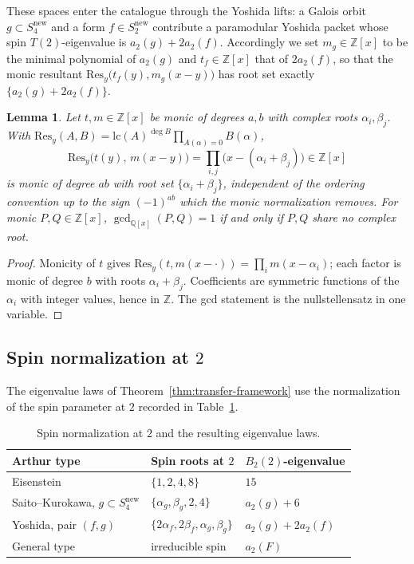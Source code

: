 \documentclass[10pt,a4paper]{amsart}
\newtheorem{lemma}[theorem]{Lemma}
\newcommand{\Q}{\mathbb{Q}}
\newcommand{\Z}{\mathbb{Z}}
\newcommand{\Res}{\mathrm{Res}}
\newcommand{\snew}{S^{\mathrm{new}}}
\providecommand{\snew}{S^{\mathrm{new}}}
\begin{document}
	These spaces enter the catalogue through the Yoshida lifts: a Galois orbit
	$g\subset\snew_4$ and a form $f\in\snew_2$ contribute a paramodular
	Yoshida packet whose spin $T(2)$-eigenvalue is $a_2(g)+2a_2(f)$.
	Accordingly we set $m_g\in\Z[x]$ to be the minimal polynomial of $a_2(g)$
	and $t_f\in\Z[x]$ that of $2a_2(f)$, so that the monic resultant
	$\Res_y\bigl(t_f(y),m_g(x-y)\bigr)$ has root set exactly
	$\{a_2(g)+2a_2(f)\}$.
	
	\begin{lemma}\label{lem:resultant}
		Let $t,m\in\Z[x]$ be monic of degrees $a,b$ with complex roots
		$\alpha_i,\beta_j$. With
		$\Res_y(A,B)=\mathrm{lc}(A)^{\deg B}\prod_{A(\alpha)=0}B(\alpha)$,
		\[
		\Res_y\bigl(t(y),\,m(x-y)\bigr)
		=\prod_{i,j}\bigl(x-(\alpha_i+\beta_j)\bigr)\in\Z[x]
		\]
		is monic of degree $ab$ with root set $\{\alpha_i+\beta_j\}$, independent
		of the ordering convention up to the sign $(-1)^{ab}$ which the monic
		normalization removes. For monic $P,Q\in\Z[x]$, $\gcd_{\Q[x]}(P,Q)=1$ if
		and only if $P,Q$ share no complex root.
	\end{lemma}
	
	\begin{proof}
		Monicity of $t$ gives $\Res_y(t,m(x-\cdot))=\prod_i m(x-\alpha_i)$; each
		factor is monic of degree $b$ with roots $\alpha_i+\beta_j$. Coefficients
		are symmetric functions of the $\alpha_i$ with integer values, hence in
		$\Z$. The gcd statement is the nullstellensatz in one variable.
	\end{proof}
	
	\subsection{Spin normalization at $2$}
	\label{ss:spin-normalization}
	
	The eigenvalue laws of Theorem~\ref{thm:transfer-framework} use the
	normalization of the spin parameter at $2$ recorded in
	Table~\ref{tab:spin-normalization}.
	
	\begin{table}[ht]
		\centering
		\begin{tabular}{@{}lll@{}}
			\toprule
			Arthur type & Spin roots at $2$ & $B_2(2)$-eigenvalue \\
			\midrule
			Eisenstein & $\{1,2,4,8\}$ & $15$ \\
			Saito--Kurokawa, $g\subset\snew_4$ & $\{\alpha_g,\beta_g,2,4\}$ & $a_2(g)+6$ \\
			Yoshida, pair $(f,g)$ & $\{2\alpha_f,2\beta_f,\alpha_g,\beta_g\}$ & $a_2(g)+2a_2(f)$ \\
			General type & irreducible spin & $a_2(F)$ \\
			\bottomrule
		\end{tabular}
		\caption{Spin normalization at $2$ and the resulting eigenvalue laws.}
		\label{tab:spin-normalization}
	\end{table}
	
\end{document}
